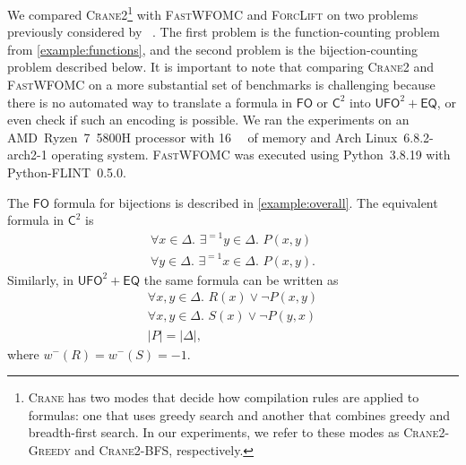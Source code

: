 \documentclass[letterpaper]{article} %
\theoremstyle{remark}
\theoremstyle{definition}
\newcommand{\Ctwo}{$\mathsf{C}^{2}$}
\newcommand{\FO}{$\mathsf{FO}$}
\newcommand{\UFO}{$\mathsf{UFO}^{2} + \mathsf{EQ}$}
\newcommand{\Cranetwo}{\textsc{Crane2}}
\newcommand{\Cranebfs}{\textsc{Crane2-BFS}}
\newcommand{\Cranegreedy}{\textsc{Crane2-Greedy}}
\begin{document}





We compared \Cranetwo{}\footnote{\textsc{Crane} has two modes that decide how
  compilation rules are applied to formulas: one that uses greedy search and
  another that combines greedy and breadth-first search. In our experiments, we
  refer to these modes as \Cranegreedy{} and \Cranebfs{}, respectively.} with
\textsc{FastWFOMC} and \textsc{ForcLift} on two problems previously considered
by \citeauthor{DBLP:conf/kr/DilkasB23}~. The
first problem is the function-counting problem from \cref{example:functions},
and the second problem is the bijection-counting problem described below. It is
important to note that comparing \Cranetwo{} and \textsc{FastWFOMC} on a more
substantial set of benchmarks is challenging because there is no automated way
to translate a formula in \FO{} or \Ctwo{} into \UFO{}, or even check if such an
encoding is possible. We ran the experiments on an AMD~Ryzen~7~5800H processor
with \SI{16}{\gibi\byte} of memory and Arch Linux~6.8.2-arch2-1 operating
system. \textsc{FastWFOMC} was executed using Python~3.8.19 with
Python-FLINT~0.5.0.

The \FO{} formula for bijections is described in \cref{example:overall}. The
equivalent formula in \Ctwo{} is
\begin{gather*}
  \forall x \in \Delta\text{. }\exists^{=1} y \in \Delta\text{. }P(x, y)\\
  \forall y \in \Delta\text{. }\exists^{=1} x \in \Delta\text{. }P(x, y).
\end{gather*}
Similarly, in \UFO{} the same formula can be written as
\begin{gather*}
  \forall x, y \in \Delta\text{. }R(x) \lor \neg P(x, y)\\
  \forall x, y \in \Delta\text{. }S(x) \lor \neg P(y, x)\\
  |P| = |\Delta|,
\end{gather*}
where $w^{-}(R) = w^{-}(S) = -1$.
\end{document}
